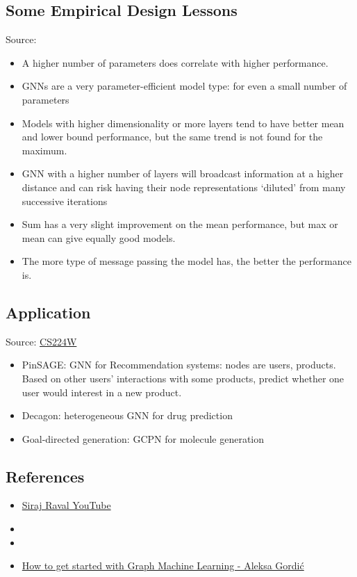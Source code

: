 \subsection{Some Empirical Design Lessons}
Source: 
\begin{itemize}
	\item A higher number of parameters does correlate with higher performance.
	\item \ac{GNN}s are a very parameter-efficient model type: for even a small number of parameters
	\item Models with higher dimensionality or more layers tend to have better mean and lower bound performance, but the same trend is not found for the maximum.
	\item \ac{GNN} with a higher number of layers will broadcast information at a higher distance and can risk having their node representations ‘diluted’ from many successive iterations
	\item Sum has a very slight improvement on the mean performance, but max or mean can give equally good models.
	\item The more type of message passing the model has, the better the performance is.
\end{itemize}

\subsection{Application}
Source: \href{https://youtu.be/p2aqXKfRXEA}{CS224W}
\begin{itemize}
	\item PinSAGE: \ac{GNN} for Recommendation systems: nodes are users, products. Based on other users' interactions with some products, predict whether one user would interest in a new product.
	\item Decagon: heterogeneous \ac{GNN} for drug prediction
	\item Goal-directed generation: GCPN for molecule generation
\end{itemize}

\subsection{References}
\begin{itemize}
	\item \href{https://youtu.be/bA261BF0bdk}{Siraj Raval YouTube}
	\item {}
	\item {}
	\item \href{https://gordicaleksa.medium.com/how-to-get-started-with-graph-machine-learning-afa53f6f963a}{How to get started with Graph Machine Learning - Aleksa Gordić}
\end{itemize}

